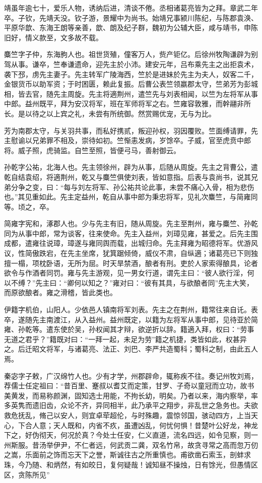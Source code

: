\documentclass[12pt,UTF8]{ctexbook}
\begin{document}
靖虽年逾七十，爱乐人物，诱纳后进，清谈不倦。丞相诸葛亮皆为之拜。章武二年卒。子钦，先靖夭没。钦子游，景耀中为尚书。始靖兄事颍川陈纪，与陈郡袁涣、平原华歆、东海王朗等亲善，歆、朗及纪子群，魏初为公辅大臣，咸与靖书，申陈旧好，情义款至，文多故不载。

麋竺字子仲，东海朐人也。祖世货殖，僮客万人，赀产钜亿。后徐州牧陶谦辟为别驾从事。谦卒，竺奉谦遗命，迎先主於小沛。建安元年，吕布乘先主之出拒袁术，袭下邳，虏先主妻子。先主转军广陵海西，竺於是进妹於先主为夫人，奴客二千，金银货币以助军资；于时困匮，赖此复振。后曹公表竺领嬴郡太守，竺弟芳为彭城相，皆去官，随先主周旋。先主将適荆州，遣竺先与刘表相闻，以竺为左将军从事中郎。益州既平，拜为安汉将军，班在军师将军之右。竺雍容敦雅，而幹翮非所长。是以待之以上宾之礼，未尝有所统御。然赏赐优宠，无与为比。

芳为南郡太守，与关羽共事，而私好携贰，叛迎孙权，羽因覆败。竺面缚请罪，先主慰谕以兄弟罪不相及，崇待如初。竺惭恚发病，岁馀卒。子威，官至虎贲中郎将。威子照，虎骑监。自竺至照，皆便弓马，善射御云。

孙乾字公祐，北海人也。先主领徐州，辟为从事，后随从周旋。先主之背曹公，遣乾自结袁绍，将適荆州，乾又与麋竺俱使刘表，皆如意指。后表与袁尚书，说其兄弟分争之变，曰：“每与刘左将军、孙公祐共论此事，未尝不痛心入骨，相为悲伤也。”其见重如此。先主定益州，乾自从事中郎为秉忠将军，见礼次麋竺，与简雍同等。顷之，卒。

简雍字宪和，涿郡人也。少与先主有旧，随从周旋。先主至荆州，雍与麋竺、孙乾同为从事中郎，常为谈客，往来使命。先主入益州，刘璋见雍，甚爱之。后先主围成都，遣雍往说璋，璋遂与雍同舆而载，出城归命。先主拜雍为昭德将军。优游风议，性简傲跌宕，在先主坐席，犹箕踞倾倚，威仪不肃，自纵適；诸葛亮已下则独擅一榻，项枕卧语，无所为屈。时天旱禁酒，酿者有刑。吏於人家索得酿具，论者欲令与作酒者同罚。雍与先主游观，见一男女行道，谓先主曰：“彼人欲行淫，何以不缚？”先主曰：“卿何以知之？”雍对曰：“彼有其具，与欲酿者同”先主大笑，而原欲酿者。雍之滑稽，皆此类也。

伊籍字机伯，山阳人。少依邑人镇南将军刘表。先主之在荆州，籍常往来自讬。表卒，遂随先主南渡江，从入益州。益州既定，以籍为左将军从事中郎，见待亚於简雍、孙乾等。遣东使於吴，孙权闻其才辩，欲逆折以辞。籍適入拜，权曰：“劳事无道之君乎？”籍既对曰：“一拜一起，未足为劳”籍之机捷，类皆如此，权甚异之。后迁昭文将军，与诸葛亮、法正、刘巴、李严共造蜀科；蜀科之制，由此五人焉。

秦宓字子敕，广汉绵竹人也。少有才学，州郡辟命，辄称疾不往。奏记州牧刘焉，荐儒士任定祖曰：“昔百里、蹇叔以耆艾而定策，甘罗、子奇以童冠而立功，故书美黄发，而易称颜渊，固知选士用能，不拘长幼，明矣。乃者以来，海内察举，率多英隽而遗旧齿，众论不齐，异同相半，此乃承平之翔步，非乱世之急务也。夫欲救危抚乱，脩己以安人，则宜卓荦超伦，与时殊趣，震惊邻国，骇动四方，上当天心，下合人意；天人既和，内省不疚，虽遭凶乱，何忧何惧！昔楚叶公好龙，神龙下之，好伪彻天，何况於真？今处士任安，仁义直道，流名四远，如令见察，则一州斯服。昔汤举伊尹，不仁者远，何武贡二龚，双名竹帛，故贪寻常之高而忽万仞之嵩，乐面前之饰而忘天下之誉，斯诚往古之所重慎也。甫欲凿石索玉，剖蚌求珠，今乃随、和炳然，有如皎日，复何疑哉！诚知昼不操烛，日有馀光，但愚情区区，贪陈所见”
\end{document}
